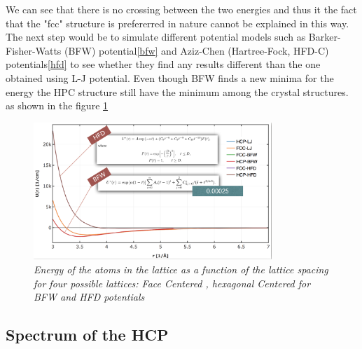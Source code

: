 \documentclass[a4paper]{article}
\begin{document}
We can see that there is no crossing between the two energies and thus it the fact that the "fcc" structure is prefererred in nature cannot be explained in this way.
The next step would be to simulate different potential models such as Barker-Fisher-Watts (BFW) potential\ref{bfw} and Aziz-Chen (Hartree-Fock, HFD-C) potentials\ref{hfd}
 to see whether they find any results different than the one obtained using L-J potential. Even though BFW finds a new minima for the energy the HPC structure still have the minimum among
 the crystal structures. as shown in the figure \ref{diff-pot}
 \begin{figure}[h]\label{diff-pot}
    \centering
    \includegraphics[width=9cm]{diff_pot.png}
    \caption{\it \label{diff-pot}Energy of the atoms in the lattice as a function of the lattice spacing for four possible lattices: Face Centered , hexagonal Centered for BFW and HFD potentials }
\end{figure}
\subsection{Spectrum of the HCP}
\end{document}
